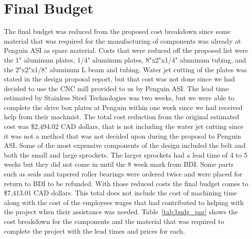 

\section{Final Budget}
The final budget was reduced from the proposed cost breakdown since some material that was required for the manufacturing of components was already at Penguin ASI as spare material. Costs that were reduced off the proposed list were the 1" aluminum plates, 1/4" aluminum plates, 8"x2"x1/4" aluminum tubing, and the 2"x2"x1/8" aluminum L beam and tubing. Water jet cutting of the plates was stated in the design proposal report, but that cost was not done since we had decided to use the CNC mill provided to us by Penguin ASI. The lead time estimated by Stainless Steel Technologies was two weeks, but we were able to complete the drive box plates at Penguin within one week since we had received help from their machinist. The total cost reduction from the original estimated cost was \$2,494.02 CAD dollars, that is not including the water jet cutting since it was not a method that was not decided upon during the proposal to Penguin ASI. Some of the most expensive components of the design included the belt and both the small and large sprockets. The larger sprockets had a lead time of 4 to 5 weeks but they did not come in until the 8 week mark from BDI. Some parts such as seals and tapered roller bearings were ordered twice and were placed for return to BDI to be refunded. With those reduced costs the final budget comes to \$7,413.01 CAD dollars. This total does not include the cost of machining time along with the cost of the employees wages that had contributed to helping with the project when their assistance was needed. Table~\ref{tab:budg_par} shows the cost breakdown for the components and the material that was required to complete the project with the lead times and prices for each.
\newpage
